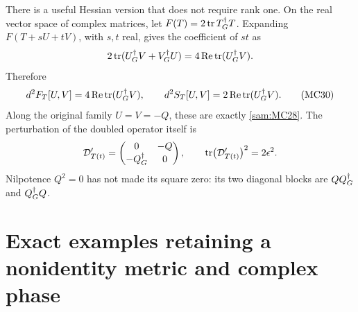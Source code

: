 There is a useful Hessian version that does not require rank one.
On the real vector space of complex matrices, let
\(F(T)=2\operatorname{tr} T^\dagger_G T\). Expanding \(F(T+sU+tV)\), with \(s,t\)
real, gives the coefficient of \(st\) as
\[
 2\operatorname{tr}(U^\dagger_G V+V^\dagger_G U)=4\operatorname{Re}\operatorname{tr}(U^\dagger_G V).
\]
Therefore
\begin{equation}
 d^2F_T[U,V]=4\operatorname{Re}\operatorname{tr}(U^\dagger_G V),\qquad
 d^2S_T[U,V]=2\operatorname{Re}\operatorname{tr}(U^\dagger_G V).
 \tag{MC30}\label{sam:MC30}
\end{equation}
Along the original family \(U=V=-Q\), these are exactly \eqref{sam:MC28}.
The perturbation of the doubled operator itself is
\[
 \mathcal D_{T(t)}'=
 \begin{pmatrix}0&-Q\\-Q^\dagger_G&0\end{pmatrix},
 \qquad
 \operatorname{tr}\bigl(\mathcal D_{T(t)}'\bigr)^2=2\epsilon^2.
\]
Nilpotence \(Q^2=0\) has not made its square zero: its two diagonal
blocks are \(QQ^\dagger_G\) and \(Q^\dagger_G Q\).

\section{Exact examples retaining a nonidentity metric and complex phase}

